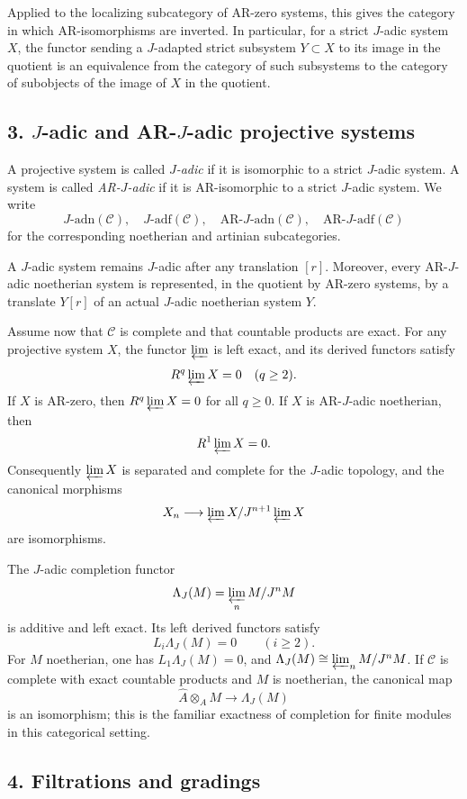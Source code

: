 \documentclass[12pt]{article}
\newcommand{\cC}{\mathcal C}
\newcommand{\adn}{\mathrm{adn}}
\newcommand{\adf}{\mathrm{adf}}
\newcommand{\AR}{\mathrm{AR}}
\begin{document}
Applied to the localizing subcategory of AR-zero systems, this gives the category in
which AR-isomorphisms are inverted. In particular, for a strict $J$-adic system $X$,
the functor sending a $J$-adapted strict subsystem $Y\subset X$ to its image in the
quotient is an equivalence from the category of such subsystems to the category of
subobjects of the image of $X$ in the quotient.

\subsection*{3. $J$-adic and AR-$J$-adic projective systems}

A projective system is called \emph{$J$-adic} if it is isomorphic to a strict
$J$-adic system. A system is called \emph{AR-$J$-adic} if it is AR-isomorphic to a
strict $J$-adic system. We write
\[
J\text{-}\adn(\cC),\quad J\text{-}\adf(\cC),\quad
\AR\text{-}J\text{-}\adn(\cC),\quad \AR\text{-}J\text{-}\adf(\cC)
\]
for the corresponding noetherian and artinian subcategories.

A $J$-adic system remains $J$-adic after any translation $[r]$. Moreover, every
AR-$J$-adic noetherian system is represented, in the quotient by AR-zero systems,
by a translate $Y[r]$ of an actual $J$-adic noetherian system $Y$.

Assume now that $\cC$ is complete and that countable products are exact. For any
projective system $X$, the functor $\varprojlim$ is left exact, and its derived
functors satisfy
\[
       R^q\varprojlim X=0\quad(q\ge2).
\]
If $X$ is AR-zero, then $R^q\varprojlim X=0$ for all $q\ge0$. If $X$ is
AR-$J$-adic noetherian, then
\[
       R^1\varprojlim X=0.
\]
Consequently $\varprojlim X$ is separated and complete for the $J$-adic topology,
and the canonical morphisms
\[
      X_n\longrightarrow \varprojlim X/J^{n+1}\varprojlim X
\]
are isomorphisms.

The $J$-adic completion functor
\[
      \Lambda_J(M)=\varprojlim_n M/J^nM
\]
is additive and left exact. Its left derived functors satisfy
\[
      L_i\Lambda_J(M)=0\qquad(i\ge2).
\]
For $M$ noetherian, one has $L_1\Lambda_J(M)=0$, and
$\Lambda_J(M)\cong\varprojlim_n M/J^nM$. If $\cC$ is complete with exact countable
products and $M$ is noetherian, the canonical map
\[
      \widehat A\otimes_A M\longrightarrow \Lambda_J(M)
\]
is an isomorphism; this is the familiar exactness of completion for finite modules
in this categorical setting.

\subsection*{4. Filtrations and gradings}
\end{document}
